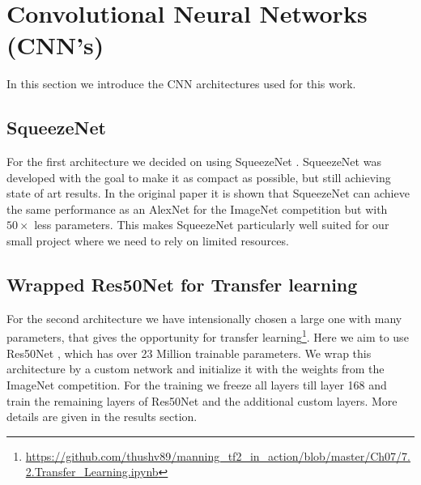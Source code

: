 \documentclass[11pt]{article}
\begin{document}

\section{Convolutional Neural Networks (CNN's)}
In this section we introduce the CNN architectures used for this work.

\subsection{SqueezeNet}
For the first architecture we decided on using SqueezeNet \cite{iandola2016}. SqueezeNet was developed with the goal to make it as compact as possible, but still achieving state of art results. In the original paper it is shown that SqueezeNet can achieve the same performance as an AlexNet for the ImageNet competition but with $50\times$ less parameters. This makes SqueezeNet particularly well suited for our small project where we need to rely on limited resources.

\subsection{Wrapped Res50Net for Transfer learning}
For the second architecture we have intensionally chosen a large one with many parameters, that gives the opportunity for transfer learning\footnote{\url{https://github.com/thushv89/manning_tf2_in_action/blob/master/Ch07/7.2.Transfer_Learning.ipynb}}. Here we aim to use Res50Net \cite{he2016deep}, which has over 23 Million trainable parameters. We wrap this architecture by a custom network and initialize it with the weights from the ImageNet competition. For the training we freeze all layers till layer 168 and train the remaining layers of Res50Net and the additional custom layers. More details are given in the results section.
\end{document}
